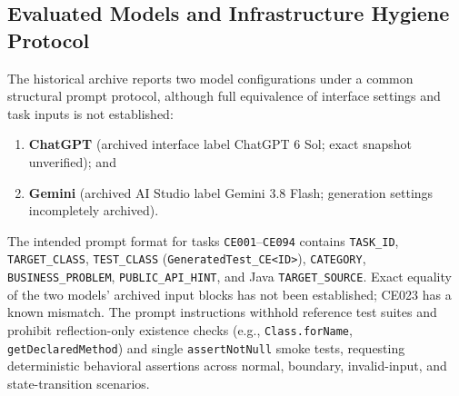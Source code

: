 \subsection{Evaluated Models and Infrastructure Hygiene Protocol}
\label{subsec:models_hygiene}
The historical archive reports two model configurations under a common structural prompt protocol, although full equivalence of interface settings and task inputs is not established:
\begin{enumerate}
    \item \textbf{ChatGPT} (archived interface label ChatGPT 6 Sol; exact snapshot unverified); and
    \item \textbf{Gemini} (archived AI Studio label Gemini 3.8 Flash; generation settings incompletely archived).
\end{enumerate}
The intended prompt format for tasks \texttt{CE001}--\texttt{CE094} contains \texttt{TASK\_ID}, \texttt{TARGET\_\allowbreak CLASS}, \texttt{TEST\_\allowbreak CLASS} (\texttt{GeneratedTest\_\allowbreak CE<ID>}), \texttt{CATEGORY}, \texttt{BUSINESS\_\allowbreak PROBLEM}, \texttt{PUBLIC\_\allowbreak API\_\allowbreak HINT}, and Java \texttt{TARGET\_\allowbreak SOURCE}. Exact equality of the two models' archived input blocks has not been established; CE023 has a known mismatch. The prompt instructions withhold reference test suites and prohibit reflection-only existence checks (e.g., \texttt{Class.\allowbreak forName}, \texttt{getDeclared\allowbreak Method}) and single \texttt{assertNotNull} smoke tests, requesting deterministic behavioral assertions across normal, boundary, invalid-input, and state-transition scenarios.

